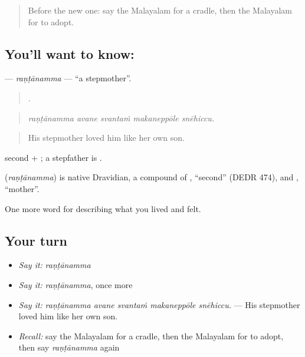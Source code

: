 \label{lesson:ML-C553-rantanamma}



\begin{quote}
Before the new one: say the Malayalam for a cradle, then the Malayalam for to adopt.
\end{quote}

\subsection*{You'll want to know: }
\textbf{} — \emph{raṇṭānamma} — \textquotedblleft{}a stepmother\textquotedblright{}.

\begin{quote}
    .
\end{quote}

\begin{quote}
\emph{raṇṭānamma avane svantaṁ makaneppōle snēhiccu.}
\end{quote}

\begin{quote}
His stepmother loved him like her own son.
\end{quote}

 second + ; a stepfather is .

\begin{cousinweb}
\textbf{} (\emph{raṇṭānamma}) is native Dravidian, a compound of , \textquotedblleft{}second\textquotedblright{} (DEDR 474), and , \textquotedblleft{}mother\textquotedblright{}.
\end{cousinweb}

\begin{grammarlens}[title={What you've built}]
One more word for describing what you lived and felt.
\end{grammarlens}

\subsection*{Your turn}
\begin{itemize}
\raggedright
  \item \emph{Say it:} \emph{raṇṭānamma}
  \item \emph{Say it:} \emph{raṇṭānamma}, once more
  \item \emph{Say it:} \emph{raṇṭānamma avane svantaṁ makaneppōle snēhiccu.} — His stepmother loved him like her own son.
  \item \emph{Recall:} say the Malayalam for a cradle, then the Malayalam for to adopt, then say \emph{raṇṭānamma} again
\end{itemize}

